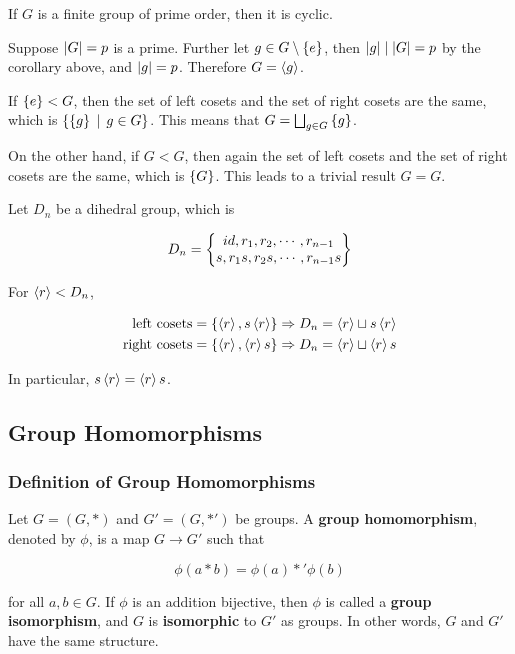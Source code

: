\documentclass[a4paper,12pt]{article}
\begin{document}
\begin{crl}
  If $G$ is a finite group of prime order, then it is cyclic.\n

  \prf Suppose $\left| G\right|=p$ is a prime. Further let $g\in G\setminus\left\{ e\right\}$, then $\left| g\right|\mid\left| G\right|=p$ by the corollary above, and $\left| g\right|=p$. Therefore $G=\left\langle g\right\rangle$.
\end{crl}\n

\begin{exm}
  If $\left\{ e\right\}<G$, then the set of left cosets and the set of right cosets are the same, which is $\left\{ \left\{ g\right\}\,\mid\, g\in G\right\}$. This means that $G=\bigsqcup_{g\in G}\left\{ g\right\}$.\n

  On the other hand, if $G<G$, then again the set of left cosets and the set of right cosets are the same, which is $\left\{ G\right\}$. This leads to a trivial result $G=G$.
\end{exm}\n

\begin{exm}
  Let $D_{n}$ be a dihedral group, which is

  $$D_{n}=\left\{ \begin{matrix}
    id,r_{1},r_{2},\cdots,r_{n-1}\\
    s,r_{1}s,r_{2}s,\cdots,r_{n-1}s
  \end{matrix}\right\}$$\s

  For $\left\langle r\right\rangle<D_{n}$,

  $$\begin{aligned}[t]
    \text{left cosets}&=\left\{ \left\langle r\right\rangle,s\left\langle r\right\rangle\right\}\Rightarrow D_{n}=\left\langle r\right\rangle\sqcup s\left\langle r\right\rangle\\
    \text{right cosets}&=\left\{ \left\langle r\right\rangle,\left\langle r\right\rangle s\right\}\Rightarrow D_{n}=\left\langle r\right\rangle\sqcup \left\langle r\right\rangle s
  \end{aligned}$$\s

  In particular, $s\left\langle r\right\rangle=\left\langle r\right\rangle s$.
\end{exm}

\subsection{Group Homomorphisms}
\subsubsection{Definition of Group Homomorphisms}
\begin{dft}
  Let $G=(G,*)$ and $G'=(G,*')$ be groups. A \textbf{group homomorphism}, denoted by $\phi$, is a map $G\to G'$ such that

  $$\phi(a*b)=\phi(a)*'\phi(b)$$\s

  for all $a,b\in G$. If $\phi$ is an addition bijective, then $\phi$ is called a \textbf{group isomorphism}, and $G$ is \textbf{isomorphic} to $G'$ as groups. In other words, $G$ and $G'$ have the same structure.
\end{dft}\n
\end{document}
